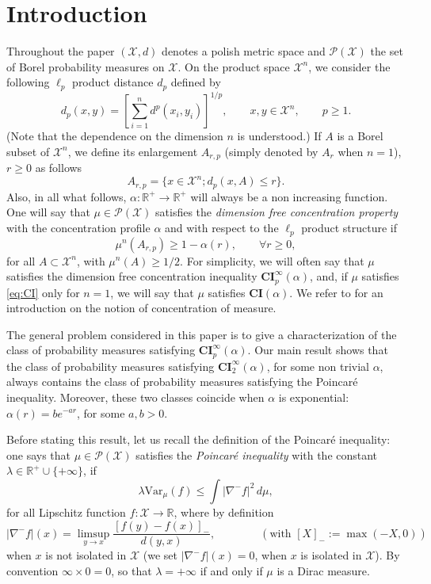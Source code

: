 \documentclass[11pt]{amsart}
\numberwithin{equation}{section}
\begin{document}
\section{Introduction}
Throughout the paper $({\mathcal{X}},d)$ denotes a polish metric space and $\mathcal{P}({\mathcal{X}})$ the set of Borel probability measures on  ${\mathcal{X}}.$
On the product space ${\mathcal{X}}^n$, we consider the following $\ell_p$ product distance $d_p$ defined by
\[
d_p(x,y) = \left[ \sum_{i=1}^n d^p(x_i,y_i)\right]^{1/p},\qquad x,y\in {\mathcal{X}}^n,\qquad p\geq 1.
\]
(Note that the dependence on the dimension $n$ is understood.)
If $A$ is a Borel subset of ${\mathcal{X}}^n$, we define its enlargement $A_{r,p}$ (simply denoted by $A_r$ when $n=1$), $r\geq0$ as follows
\[
A_{r,p} =\{ x \in {\mathcal{X}}^n ;  d_p(x,A) \leq r\}.
\]
Also, in all what follows, $\alpha : {\mathbb{R}}^+ \to {\mathbb{R}}^+$ will always be a non increasing function. One will say that $\mu \in \mathcal{P}({\mathcal{X}})$ satisfies the \emph{dimension free concentration property} with the concentration profile $\alpha$ and with respect to the $\ell_p$ product structure if
\begin{equation}\label{eq:CI}
\mu^n(A_{r,p})\geq 1-\alpha(r),\qquad \forall r\geq 0,
\end{equation}
for all $A\subset {\mathcal{X}}^n$, with $\mu^n(A)\geq 1/2$. For simplicity,  we will often say that $\mu$ satisfies the dimension free concentration inequality $\mathbf{CI}_p^\infty(\alpha)$, and, if $\mu$ satisfies \eqref{eq:CI} only for $n=1$, we will say that $\mu$ satisfies $\mathbf{CI}(\alpha).$
We refer to \cite{Ledoux-book} for an introduction on the notion of concentration of measure.

The general problem considered in this paper is to give a characterization of the class of probability measures satisfying $\mathbf{CI}_p^\infty(\alpha)$. Our main result shows that the class of probability measures satisfying $\mathbf{CI}^\infty_2(\alpha)$, for some non trivial $\alpha$, always contains the class of probability measures satisfying the Poincar\'e inequality. Moreover, these two classes coincide when $\alpha$ is exponential: $\alpha(r)=be^{-ar}$, for some $a,b>0.$

Before stating this result, let us recall the definition of the Poincar\'e inequality:  one says that $\mu \in \mathcal{P}({\mathcal{X}})$ satisfies the \emph{Poincar\'e inequality} with the constant $\lambda \in {\mathbb{R}}^+\cup\{+\infty\}$, if 
\begin{equation}\label{Poincare}
\lambda\mathrm{Var}_\mu (f) \leq \int |\nabla^- f|^2\,d\mu,
\end{equation}
for all Lipschitz function $f:{\mathcal{X}}\to {\mathbb{R}}$, where by definition 
\[
|\nabla^- f|(x) = \limsup_{y \to x} \frac{[f(y)-f(x)]_-}{d(y,x)}, 
\qquad \qquad (\mbox{with } [X]_-:=\max(-X,0))
\]
when $x$ is not isolated in ${\mathcal{X}}$ (we set $|\nabla^- f|(x)=0$, when $x$ is isolated in ${\mathcal{X}}$).
By convention $\infty \times 0 =0$, so that $\lambda=+\infty$ if and only if $\mu$ is a Dirac measure.
\end{document}
